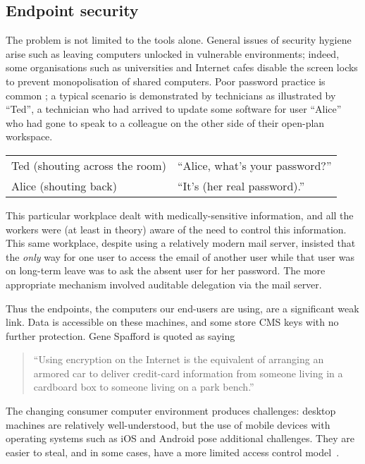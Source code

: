 \documentclass{article}
\def\cite{\citep}
\begin{document}
\subsection{Endpoint security}\label{sec:endpoint}

The problem is not limited to the tools alone.  General issues of
security hygiene arise such as leaving computers unlocked in
vulnerable environments; indeed, some  organisations 
such as  universities
and Internet cafes
disable the screen locks\label{pg:screenlocks} to prevent
monopolisation of shared computers.  Poor password practice is
common \cite{mPassword08}; a typical scenario is demonstrated
by technicians as illustrated by ``Ted'', a technician
who had arrived to update some software for user ``Alice'' who had
gone to speak to a colleague on the other side of their open-plan
workspace.

\begin{centering}
  \begin{tabular}{ll}
    Ted (shouting across the room)&“Alice, what's your password?”\\
    Alice (shouting back)&“It's (her real password).”
  \end{tabular}

\end{centering}
\noindent This particular workplace dealt with medically-sensitive information,
and all the workers were (at least in theory) aware of the need to
control this information.
This same workplace, despite using a relatively modern mail server,
insisted that the \emph{only} way for one user to access the email of
another user while that user was on long-term leave was to ask the
absent user for her password.  The more appropriate mechanism
involved auditable delegation via the mail server.

Thus the endpoints, the computers our end-users are using, are a
significant weak link.   Data is accessible on these machines, and
some store CMS keys with no further protection.  Gene Spafford is quoted as saying
\begin{quote}
  ``Using encryption on the Internet is the equivalent of arranging
   an armored car to deliver credit-card information from someone
   living in a cardboard box to someone living on a park bench.''
\end{quote}

The changing consumer computer environment produces challenges: desktop machines are relatively well-understood, but the use of mobile devices with operating systems such as iOS and Android pose additional challenges.  They are easier to steal, and in some cases, have a more limited access control model~\cite{Hayashi+12}.
\end{document}

